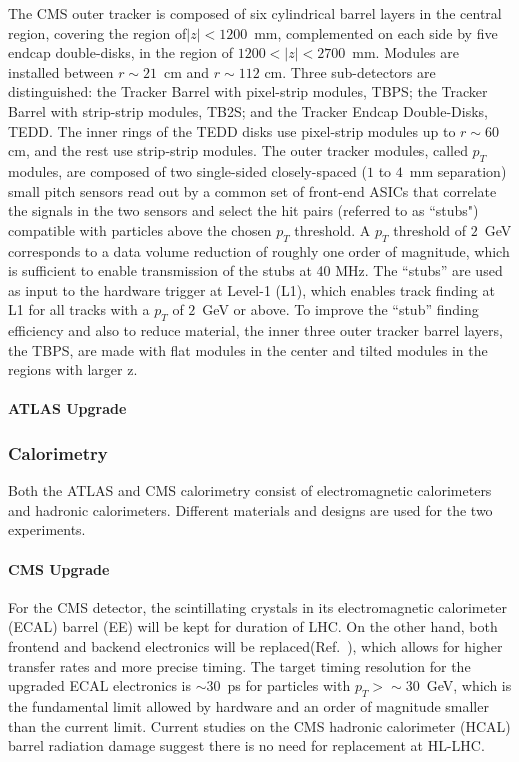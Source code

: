 The CMS outer tracker is composed of six cylindrical barrel layers in the central region, covering the region of$|z| < 1200$~mm, complemented on each side by five endcap double-disks, in
the region of $1200 < |z| < 2700$~mm. Modules are installed between $r\sim21$~cm and $r\sim112$ cm. Three sub-detectors are distinguished: the Tracker Barrel with pixel-strip modules, TBPS; the Tracker Barrel with strip-strip modules, TB2S; and the Tracker Endcap
Double-Disks, TEDD. The inner rings of the TEDD disks use pixel-strip modules up to $r\sim 60$ cm, and the rest use strip-strip modules.
The outer tracker modules, called $p_T$ modules, are composed of two single-sided closely-spaced ($1$ to $4$~mm separation) small pitch sensors read out by a common set of front-end ASICs that correlate the signals in the two sensors and select the hit pairs (referred to as ``stubs") compatible with particles above the chosen $p_T$ threshold. A $p_T$ threshold of $2$~GeV corresponds to a data volume reduction of roughly one order of magnitude, which is sufficient to enable transmission of the stubs at 40 MHz.
The ``stubs'' are used as input to the hardware trigger at Level-1 (L1), which enables track finding at L1 for all tracks with a $p_T$ of $2$~GeV or above. 
To improve the ``stub'' finding efficiency and also to reduce material, the inner three outer tracker barrel layers, the TBPS, are made with flat modules in the center and tilted modules in the regions with larger z. 

\paragraph{ATLAS Upgrade}


\subsubsection{Calorimetry} \label{sec:upgradecalo}

Both the ATLAS and CMS calorimetry consist of electromagnetic calorimeters and hadronic calorimeters. Different materials and designs are used for the two experiments. 

\paragraph{CMS Upgrade} 
For the CMS detector, the scintillating crystals in its electromagnetic calorimeter (ECAL) barrel (EE) will be kept for duration of LHC. On the other hand, both frontend and backend electronics will be replaced(Ref.~\cite{Lourenco:2283187}), which allows for higher transfer rates and more precise timing. The target timing resolution for the upgraded ECAL electronics is $\sim30$~ps for particles with $p_T >\sim30$~GeV, which is the fundamental limit allowed by hardware and an order of magnitude smaller than the current limit. 
Current studies on the CMS hadronic calorimeter (HCAL) barrel radiation damage suggest there is no need for replacement at HL-LHC. 

